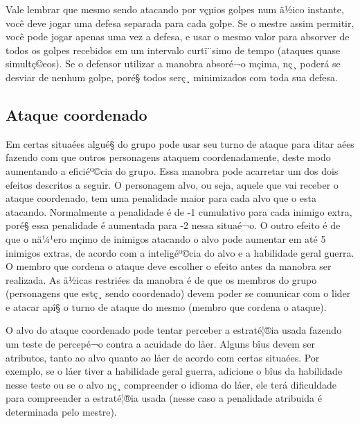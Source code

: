 Vale lembrar que mesmo sendo atacando por vçµios golpes num ä½ico instante, você deve jogar uma defesa separada para cada golpe. Se o mestre assim permitir, você pode jogar apenas uma vez a defesa, e usar o mesmo valor para absorver de todos os golpes recebidos em um intervalo curtï¨simo de tempo (ataques quase simultç©eos). Se o defensor utilizar a manobra absoré¬o mçima, nç¸ poderá se desviar de nenhum golpe, poré§ todos serç¸ minimizados com toda sua defesa.
 

\subsection{Ataque coordenado}

Em certas situaées algué§ do grupo pode usar seu turno de ataque para ditar aées fazendo com que outros personagens  ataquem coordenadamente, deste modo aumentando a eficiéº©cia do grupo. Essa manobra pode acarretar um dos dois efeitos descritos a seguir. O personagem alvo, ou seja, aquele que vai receber o ataque coordenado, tem uma penalidade maior para cada alvo que o esta atacando. Normalmente a penalidade é de -1 cumulativo para cada inimigo extra, poré§ essa penalidade é aumentada para -2 nessa situaé¬o. O outro efeito é de que o nä¼¹ero mçimo de inimigos atacando o alvo pode aumentar em até 5 inimigos extras, de acordo com a inteligéº©cia do alvo e a habilidade geral guerra. O membro que cordena o ataque deve escolher o efeito antes da manobra ser realizada. As ä½icas restriées da manobra é de que os membros do grupo (personagens que estç¸ sendo coordenado) devem poder se comunicar com o lider e atacar apî§ o turno de ataque do mesmo (membro que cordena o ataque).

O alvo do ataque coordenado pode tentar perceber a estraté¦®ia usada fazendo um teste de percepé¬o contra a acuidade do låer. Alguns bîus devem ser atributos, tanto ao alvo quanto ao låer de acordo com certas situaées. Por exemplo, se o låer tiver a habilidade geral guerra, adicione o bîus da habilidade nesse teste ou se o alvo nç¸ compreender o idioma do låer, ele terá dificuldade para compreender a estraté¦®ia usada (nesse caso a penalidade atribuida é determinada pelo mestre).



